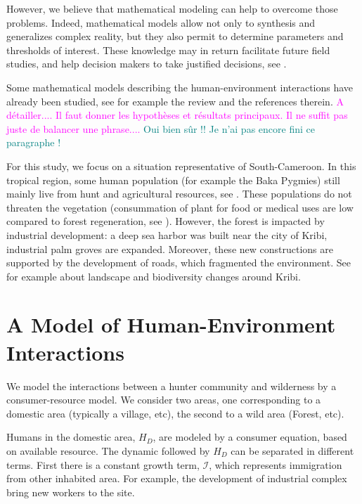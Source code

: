 \documentclass{article}
\newcommand{\cI}{\mathcal{I}}
\newcommand{\marc}[1]{\textcolor{teal}{#1}}
\newcommand{\YD}[1]{\textcolor{magenta}{#1}}
\begin{document}
However, we believe that mathematical modeling can help to overcome those problems. Indeed, mathematical models allow not only to synthesis and generalizes complex reality, but they also permit to determine parameters and thresholds of interest. These knowledge may in return facilitate future field studies, and help decision makers to take justified decisions, see \cite{deangelis_towards_2021}.

Some mathematical models describing the human-environment interactions have already been studied, see for example the review \cite{fanuel_modelling_2023} and the references therein. \YD{A détailler.... Il faut donner les hypothèses et résultats principaux. Il ne suffit pas juste de balancer une phrase....} \marc{Oui bien sûr !! Je n'ai pas encore fini ce paragraphe !}

For this study, we focus on a situation representative of South-Cameroon. In this tropical region, some human population (for example the Baka Pygmies) still mainly live from hunt and agricultural resources, see \cite{avila_martin_food_2024}. These populations do not threaten the vegetation (consummation of plant for food or medical uses are low compared to forest regeneration, see \cite{koppert_consommation_1996}). However, the forest is impacted by industrial development: a deep sea harbor was built near the city of Kribi, industrial palm groves are expanded. Moreover, these new constructions are supported by the development of roads, which fragmented the environment. See for example \cite{foonde_change_2018, romain_deforestation_2017} about landscape and biodiversity changes around Kribi.

\section{A Model of Human-Environment Interactions}

We model the interactions between a hunter community and wilderness by a consumer-resource model. We consider two areas, one corresponding to a domestic area (typically a village, etc), the second to a wild area (Forest, etc).

Humans in the domestic area, $H_D$, are modeled by a consumer equation, based on available resource. The dynamic followed by $H_D$ can be separated in different terms. 
First there is a constant growth term, $\cI$, which represents immigration from other inhabited area. For example, the development of industrial complex bring new workers to the site.
\end{document}
